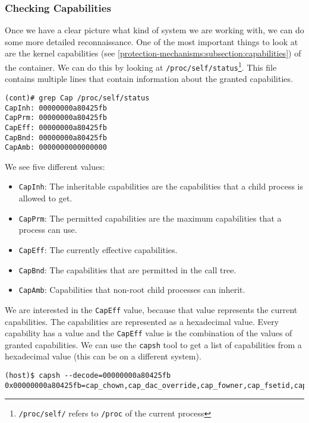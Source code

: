 \subsubsection{Checking Capabilities}
Once we have a clear picture what kind of system we are working with, we can do some more detailed reconnaissance. One of the most important things to look at are the kernel capabilities (see \autoref{protection-mechanisms:subsection:capabilities}) of the container. We can do this by looking at \lstinline{/proc/self/status}\footnote{\lstinline{/proc/self/} refers to \lstinline{/proc} of the current process}. This file contains multiple lines that contain information about the granted capabilities.

\begin{lstlisting}[caption={Capabilities of process in container},captionpos=b]
(cont)# grep Cap /proc/self/status
CapInh:	00000000a80425fb
CapPrm:	00000000a80425fb
CapEff:	00000000a80425fb
CapBnd:	00000000a80425fb
CapAmb:	0000000000000000
\end{lstlisting}

We see five different values:
\begin{itemize}
    \item \lstinline{CapInh}: The inheritable capabilities are the capabilities that a child process is allowed to get.
    \item \lstinline{CapPrm}: The permitted capabilities are the maximum capabilities that a process can use.
    \item \lstinline{CapEff}: The currently effective capabilities.
    \item \lstinline{CapBnd}: The capabilities that are permitted in the call tree.
    \item \lstinline{CapAmb}: Capabilities that non-root child processes can inherit.
\end{itemize}

We are interested in the \lstinline{CapEff} value, because that value represents the current capabilities. The capabilities are represented as a hexadecimal value. Every capability has a value and the \lstinline{CapEff} value is the combination of the values of granted capabilities. We can use the \lstinline{capsh} tool to get a list of capabilities from a hexadecimal value (this can be on a different system).

\begin{lstlisting}[caption={\lstinline{capsh} shows capabilities},captionpos=b]
(host)$ capsh --decode=00000000a80425fb
0x00000000a80425fb=cap_chown,cap_dac_override,cap_fowner,cap_fsetid,cap_kill,cap_setgid,cap_setuid,cap_setpcap,cap_net_bind_service,cap_net_raw,cap_sys_chroot,cap_mknod,cap_audit_write,cap_setfcap
\end{lstlisting}

